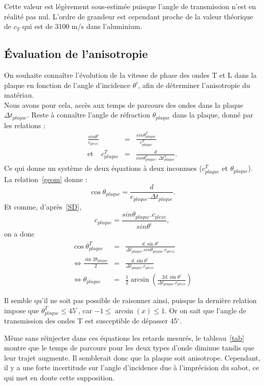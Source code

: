 \documentclass[twoside]{article}
\begin{document}
\begin{multicols}{2}
Cette valeur est légèrement sous-estimée puisque l'angle de transmission n'est en réalité pas nul. L'ordre de grandeur est cependant proche de la valeur théorique de $c_{T}$ qui est de 3100 m/s dans l'aluminium.
	
	\subsection{Évaluation de l'anisotropie}
	On souhaite connaître l'évolution de la vitesse de phase des ondes T et L dans la plaque en fonction de l'angle d'incidence $\theta^{i}$, afin de déterminer l'anisotropie du matériau.\\
	
	Nous avons pour cela, accès aux temps de parcours des ondes dans la plaque $\Delta t_{plaque}$. Reste à connaître l'angle de réfraction $\theta_{plaque}$ dans la plaque, donné par les relations : 
\begin{eqnarray}
		\frac{sin\theta^{i}}{c_{plexi}} &=&\frac{sin\theta^{T}_{plaque}}{c_{plaque}^T} \label{SD}\\ \text{et}~~~~~
		c_{plaque}^T&=&\frac{d}{cos\theta_{plaque}^T. ~\Delta t_{plaque}^T} \label{geom}.	
\end{eqnarray}
Ce qui donne un système de deux équations à deux inconnues ($c_{plaque}^T$ et $\theta_{plaque}$).\\

La relation~\ref{geom} donne : $$\cos\theta_{plaque} = \frac{d}{c_{plaque}. \Delta t_{plaque}}.$$
Et comme, d'après~\ref{SD}, $$c_{plaque} = \frac{sin\theta_{plaque}.c_{plexi}}{sin\theta^{i}},$$ on a donc 
\begin{eqnarray*}
\cos\theta^{T}_{plaque}&=& \frac{d.\sin\theta^{i}}{\Delta t_{plaque}.sin\theta_{plaque}.c_{plexi}}\\
	\Leftrightarrow  \frac{\sin2\theta_{plaque}}{2}& = &\frac{d.\sin\theta^{i}}{\Delta t_{plaque}.c_{plexi}}\\
	\Leftrightarrow \theta_{plaque} &=& \frac{1}{2}\arcsin\left(\frac{2d.\sin\theta^{i}}{\Delta t_{plaque}.c_{plexi}}\right)
\end{eqnarray*}

Il semble qu'il ne soit pas possible de raisonner ainsi, puisque la dernière relation impose que $\theta^{T}_{plaque}\leq 45^{\circ}$, car $-1\leq\arcsin(x) \leq1$. Or on sait que l'angle de transmission des ondes T est susceptible de dépasser 45$^{\circ}$. \\ \quad

Même sans réinjecter dans ces équations les retards mesurés, le tableau~\ref{tab} montre que le temps de parcours pour les deux types d'onde diminue tandis que leur trajet augmente. Il semblerait donc que la plaque soit anisotrope. Cependant, il y a une forte incertitude sur l'angle d'incidence due à l'imprécision du sabot, ce qui met en doute cette supposition.


\end{multicols}
\end{document}
